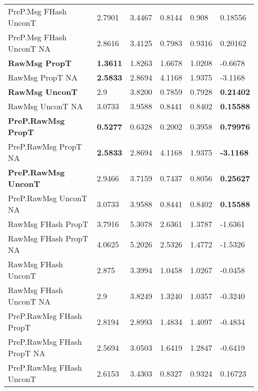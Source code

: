 \begin{table}[htb]
\begin{tabularx}{\textwidth}{|Y|L{0.091\textwidth}|L{0.096\textwidth}|L{0.077\textwidth}|L{0.077\textwidth}|L{0.105\textwidth}|}
        \hline
        PreP.Msg FHash UnconT	       		& 2.7901				& 3.4467					& 0.8144					& 0.908						& 0.18556  		\\
        PreP.Msg FHash UnconT NA      		& 2.8616				& 3.4125					& 0.7983					& 0.9316					& 0.20162 		\\
        \hline
        \textbf{RawMsg PropT}       		& \textbf{1.3611}		& 1.8263					& 1.6678					& 1.0208					& -0.6678		\\
        RawMsg PropT NA           			& \textbf{2.5833}		& 2.8694					& 4.1168					& 1.9375					& -3.1168		\\
        \hline
        \textbf{RawMsg UnconT }        		& 2.9   				& 3.8200					& 0.7859					& 0.7928					& \textbf{0.21402}		\\
        RawMsg UnconT NA              		& 3.0733				& 3.9588					& 0.8441					& 0.8402					& \textbf{0.15588}		\\
        \hline
        \textbf{PreP.RawMsg PropT }  		& \textbf{0.5277}		& 0.6328					& 0.2002					& 0.3958					& \textbf{0.79976}		\\
        PreP.RawMsg PropT NA        		& \textbf{2.5833}		& 2.8694					& 4.1168					& 1.9375					& \textbf{-3.1168}		\\
        \hline
        \textbf{PreP.RawMsg UnconT}    		& 2.9466				& 3.7159					& 0.7437					& 0.8056					& \textbf{0.25627}		\\
        PreP.RawMsg UnconT NA             	& 3.0733				& 3.9588					& 0.8441					& 0.8402					& \textbf{0.15588}		\\
        \hline
        RawMsg FHash PropT					& 3.7916				& 5.3078					& 2.6361					& 1.3787					& -1.6361		\\
        RawMsg FHash PropT NA        		& 4.0625				& 5.2026					& 2.5326					& 1.4772					& -1.5326		\\
        \hline
        RawMsg FHash UnconT    				& 2.875 				& 3.3994					& 1.0458					& 1.0267					& -0.0458		\\
        RawMsg FHash UnconT NA         		& 2.9   				& 3.8249					& 1.3240					& 1.0357					& -0.3240		\\
        \hline
        PreP.RawMsg FHash PropT				& 2.8194				& 2.8993					& 1.4834					& 1.4097					& -0.4834		\\
        PreP.RawMsg FHash PropT NA    		& 2.5694				& 3.0503					& 1.6419					& 1.2847					& -0.6419		\\
        \hline
        PreP.RawMsg FHash UnconT			& 2.6153				& 3.4303					& 0.8327					& 0.9324					& 0.16723		\\

\end{tabularx}
\end{table}
